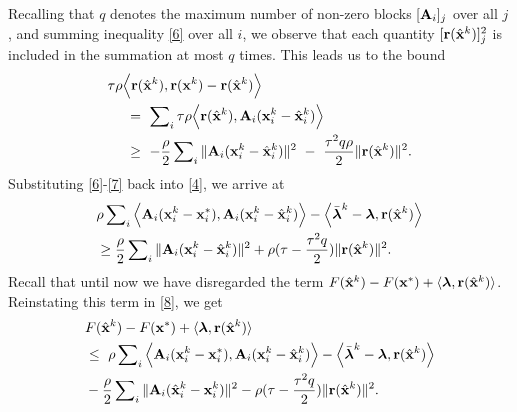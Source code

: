 \documentclass[doublecolumn]{IEEEtran}
\begin{document}
Recalling that $q$ denotes the maximum number of non-zero blocks $[ { {\bf A} }_i ]_j$ over all $j$, and summing inequality \eqref{6} over all $i$, we observe that each quantity $[{ {\bf r} }({\hat{\mathbf x}}^k)]_j^2$ is included in the summation at most $q$ times. This leads us to the bound
\begin{align}\label{7}
& \tau\rho \Big\langle { {\bf r} }({\hat{\mathbf x}}^k)  ,  { {\bf r} }({ {\bf x} }^k) - { {\bf r} }({\hat{\mathbf x}}^k) \Big\rangle  \notag\\
&\quad ~=~  \sum\nolimits_i\tau\rho\Big\langle { {\bf r} }({\hat{\mathbf x}}^k)  ,  { {\bf A} }_i({ {\bf x} }_i^k-\hat{ {\bf x} }_i^k) \Big\rangle\\
& \quad~\geq~ -  \frac{\rho}{2}\sum\nolimits_i  \| { {\bf A} }_i({ {\bf x} }_i^k-\hat{ {\bf x} }_i^k) \|^2 ~-~ \frac{\tau^2q\rho}{2}\| { {\bf r} }({\hat{\mathbf x}}^k) \|^2 .\notag
\end{align}
Substituting \eqref{6}-\eqref{7} back into \eqref{4}, we arrive at
\begin{align}\label{8}
& {\rho}\sum\nolimits_i\Big\langle { {\bf A} }_i( { {\bf x} }_i^k -{ {\bf x} }_i^*) , { {\bf A} }_i({ {\bf x} }_i^k-{\hat{\mathbf x}}_i^k) \Big\rangle - \Big\langle \bar{\boldsymbol{\lambda}}^k-{\boldsymbol{\lambda}} ,  { {\bf r} }({\hat{\mathbf x}}^k) \Big\rangle  \notag\\
& \geq  \frac{\rho}{2} \sum\nolimits_i \|{ {\bf A} }_i({ {\bf x} }_i^{k}-\hat{ {\bf x} }_i^k)\|^2 + \rho(\tau-\frac{\tau^2q}{2}) \| { {\bf r} }({\hat{\mathbf x}}^k) \|   ^2.
\end{align}
Recall that until now we have disregarded the term $F(\hat{ {\bf x} }^k) - F({ {\bf x} }^*) + \langle{\boldsymbol{\lambda}}, { {\bf r} }({\hat{\mathbf x}}^k) \rangle$. Reinstating this term in \eqref{8}, we get
\begin{align}\label{lemma3_eq}
&F({\hat{\mathbf x}}^k) -  F({ {\bf x} }^*) + \langle {\boldsymbol{\lambda}}, { {\bf r} }({\hat{\mathbf x}}^k)\rangle \\
&\leq~
{\rho}\sum\nolimits_i\Big\langle { {\bf A} }_i( { {\bf x} }_i^k -{ {\bf x} }_i^*) , { {\bf A} }_i({ {\bf x} }_i^k-{\hat{\mathbf x}}_i^k) \Big\rangle -  \Big\langle \bar{\boldsymbol{\lambda}}^k-{\boldsymbol{\lambda}} ,  { {\bf r} }({\hat{\mathbf x}}^k) \Big\rangle \notag\\
&    - \frac{\rho}{2} \sum\nolimits_i \|{ {\bf A} }_i(\hat{ {\bf x} }_i^k-{ {\bf x} }_i^{k})\|^2 - \rho(\tau-\frac{\tau^2 q}{2})\| { {\bf r} }({\hat{\mathbf x}}^k) \|^2.\notag
\end{align}
\end{document}
